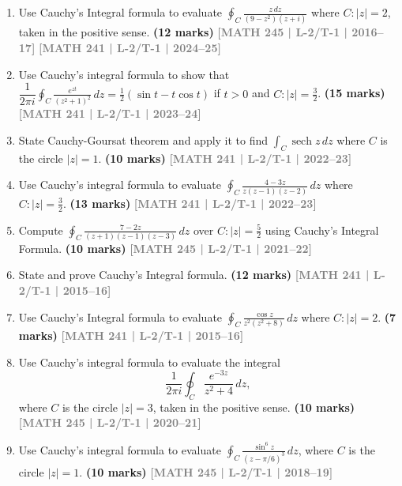 \documentclass[12pt]{article}
\newcommand{\yr}[1]{\hfill\textcolor{gray}{\small\textbf{[#1]}}}
\newcommand{\mk}[1]{\textcolor{orange!70!black}{\small\textbf{(#1 marks)}}}
\begin{document}
\begin{enumerate}


\item Use Cauchy's Integral formula to evaluate $\displaystyle\oint_{C}\frac{z\,dz}{(9-z^{2})(z+i)}$ where $C\colon|z|=2$, taken in the positive sense.
\mk{12} \yr{MATH 245 | L-2/T-1 | 2016--17} \yr{MATH 241 | L-2/T-1 | 2024--25}



\item Use Cauchy's integral formula to show that $\dfrac{1}{2\pi i}\displaystyle\oint_{C}\frac{e^{zt}}{(z^{2}+1)^{2}}\,dz=\tfrac{1}{2}(\sin t - t\cos t)$ if $t>0$ and $C\colon|z|=\tfrac{3}{2}$.
\mk{15} \yr{MATH 241 | L-2/T-1 | 2023--24}



\item State Cauchy-Goursat theorem and apply it to find $\displaystyle\int_{C}\operatorname{sech}z\,dz$ where $C$ is the circle $|z|=1$.
\mk{10} \yr{MATH 241 | L-2/T-1 | 2022--23}



\item Use Cauchy's integral formula to evaluate $\displaystyle\oint_{C}\frac{4-3z}{z(z-1)(z-2)}\,dz$ where $C\colon|z|=\tfrac{3}{2}$.
\mk{13} \yr{MATH 241 | L-2/T-1 | 2022--23}



\item Compute $\displaystyle\oint_{C}\frac{7-2z}{(z+1)(z-1)(z-3)}\,dz$ over $C\colon|z|=\tfrac{5}{2}$ using Cauchy's Integral Formula.
\mk{10} \yr{MATH 245 | L-2/T-1 | 2021--22}



\item State and prove Cauchy's Integral formula.
\mk{12} \yr{MATH 241 | L-2/T-1 | 2015--16}



\item Use Cauchy's Integral formula to evaluate $\displaystyle\oint_{C}\frac{\cos z}{z^{2}(z^{2}+8)}\,dz$ where $C\colon|z|=2$.
\mk{7} \yr{MATH 241 | L-2/T-1 | 2015--16}
  

  
  \item Use Cauchy's integral formula to evaluate the integral
\[
\frac{1}{2\pi i}\oint_{C} \frac{e^{-3z}}{z^{2}+4}\,dz,
\]
where $C$ is the circle $|z|=3$, taken in the positive sense.
\mk{10} \yr{MATH 245 | L-2/T-1 | 2020--21}



\item Use Cauchy's integral formula to evaluate $\displaystyle\oint_{C}\frac{\sin^{6}z}{(z-\pi/6)^{3}}\,dz$, where $C$ is the circle $|z|=1$.
\mk{10} \yr{MATH 245 | L-2/T-1 | 2018--19}




\end{enumerate}
\end{document}
